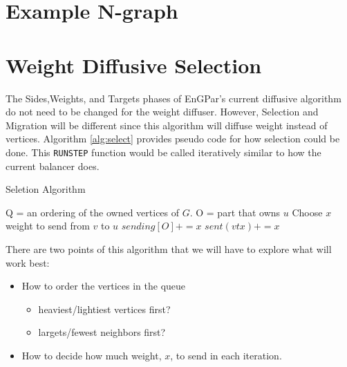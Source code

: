 \documentclass[a4paper]{article}
\begin{document}
{ \color{blue}

  \section{Example N-graph}
  
  \section{Weight Diffusive Selection}
  \label{sec:select}

  The Sides,Weights, and Targets phases of EnGPar's current diffusive algorithm do not need to be changed for the weight diffuser. However, Selection and Migration will be different since this algorithm will diffuse weight instead of vertices. Algorithm \ref{alg:select} provides pseudo code for how selection could be done. This \texttt{RUNSTEP} function would be called iteratively similar to how the current balancer does.

  \begin{algorithm}
    \caption{Seletion Algorithm}
    \label{alg:select}
    \small
    \begin{algorithmic}[1]
      \State Q = an ordering of the owned vertices of $G$.
      \State O = part that owns $u$
      \State Choose $x$ weight to send from $v$ to $u$
      \State
      \State $sending[O] += x$
      \State $sent(vtx) += x$
      \EndIf
      \EndFor
      \EndFor
      \EndProcedure
    \end{algorithmic}
  \end{algorithm}

  \noindent There are two points of this algorithm that we will have to explore what will work best:
  \begin{itemize}
  \item How to order the vertices in the queue
    \begin{itemize}
    \item heaviest/lightiest vertices first?
    \item largets/fewest neighbors first?
    \end{itemize}
  \item How to decide how much weight, $x$, to send in each iteration.
  \end{itemize}

}
\end{document}
